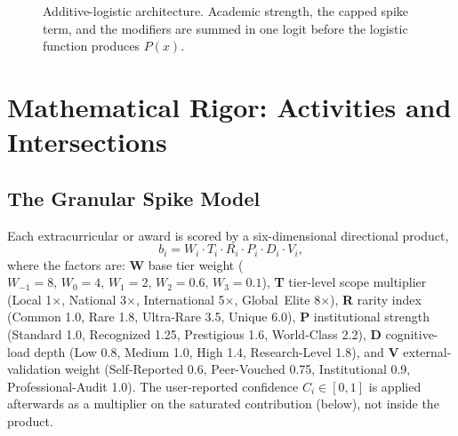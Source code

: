 \documentclass[conference]{IEEEtran}
\begin{document}
\begin{figure}[!t]
\centering
{}
\caption{Additive-logistic architecture. Academic strength, the capped spike term, and the modifiers are summed in one logit before the logistic function produces $P(x)$.}
\label{fig:architecture}
\end{figure}

\section{Mathematical Rigor: Activities and Intersections}
\subsection{The Granular Spike Model}
Each extracurricular or award is scored by a six-dimensional directional product,
\begin{equation}
b_i = W_i \cdot T_i \cdot R_i \cdot P_i \cdot D_i \cdot V_i,
\end{equation}
where the factors are: \textbf{W} base tier weight ($W_{-1}{=}8,\,W_0{=}4,\,W_1{=}2,\,W_2{=}0.6,\,W_3{=}0.1$), \textbf{T} tier-level scope multiplier (Local 1$\times$, National 3$\times$, International 5$\times$, Global~Elite 8$\times$), \textbf{R} rarity index (Common 1.0, Rare 1.8, Ultra-Rare 3.5, Unique 6.0), \textbf{P} institutional strength (Standard 1.0, Recognized 1.25, Prestigious 1.6, World-Class 2.2), \textbf{D} cognitive-load depth (Low 0.8, Medium 1.0, High 1.4, Research-Level 1.8), and \textbf{V} external-validation weight (Self-Reported 0.6, Peer-Vouched 0.75, Institutional 0.9, Professional-Audit 1.0). The user-reported confidence $C_i\in[0,1]$ is applied afterwards as a multiplier on the saturated contribution (below), not inside the product.
\end{document}
